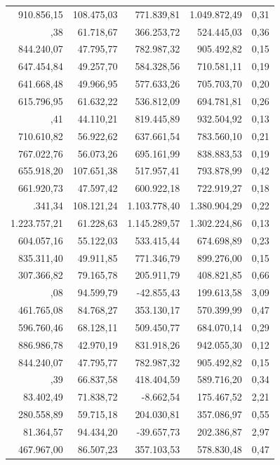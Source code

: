 \documentclass[a4paper]{article}
\begin{document}
\begin{table}
\begin{tabular}[t]{rrrrr}
910.856,15 & 108.475,03 & 771.839,81 & 1.049.872,49 & 0,31\\
\addlinespace
445.349,38 & 61.718,67 & 366.253,72 & 524.445,03 & 0,36\\
844.240,07 & 47.795,77 & 782.987,32 & 905.492,82 & 0,15\\
647.454,84 & 49.257,70 & 584.328,56 & 710.581,11 & 0,19\\
641.668,48 & 49.966,95 & 577.633,26 & 705.703,70 & 0,20\\
615.796,95 & 61.632,22 & 536.812,09 & 694.781,81 & 0,26\\
\addlinespace
875.975,41 & 44.110,21 & 819.445,89 & 932.504,92 & 0,13\\
710.610,82 & 56.922,62 & 637.661,54 & 783.560,10 & 0,21\\
767.022,76 & 56.073,26 & 695.161,99 & 838.883,53 & 0,19\\
655.918,20 & 107.651,38 & 517.957,41 & 793.878,99 & 0,42\\
661.920,73 & 47.597,42 & 600.922,18 & 722.919,27 & 0,18\\
\addlinespace
1.242.341,34 & 108.121,24 & 1.103.778,40 & 1.380.904,29 & 0,22\\
1.223.757,21 & 61.228,63 & 1.145.289,57 & 1.302.224,86 & 0,13\\
604.057,16 & 55.122,03 & 533.415,44 & 674.698,89 & 0,23\\
835.311,40 & 49.911,85 & 771.346,79 & 899.276,00 & 0,15\\
307.366,82 & 79.165,78 & 205.911,79 & 408.821,85 & 0,66\\
\addlinespace
78.379,08 & 94.599,79 & -42.855,43 & 199.613,58 & 3,09\\
461.765,08 & 84.768,27 & 353.130,17 & 570.399,99 & 0,47\\
596.760,46 & 68.128,11 & 509.450,77 & 684.070,14 & 0,29\\
886.986,78 & 42.970,19 & 831.918,26 & 942.055,30 & 0,12\\
844.240,07 & 47.795,77 & 782.987,32 & 905.492,82 & 0,15\\
\addlinespace
504.060,39 & 66.837,58 & 418.404,59 & 589.716,20 & 0,34\\
83.402,49 & 71.838,72 & -8.662,54 & 175.467,52 & 2,21\\
280.558,89 & 59.715,18 & 204.030,81 & 357.086,97 & 0,55\\
81.364,57 & 94.434,20 & -39.657,73 & 202.386,87 & 2,97\\
467.967,00 & 86.507,23 & 357.103,53 & 578.830,48 & 0,47\\

\end{tabular}
\end{table}
\end{document}

